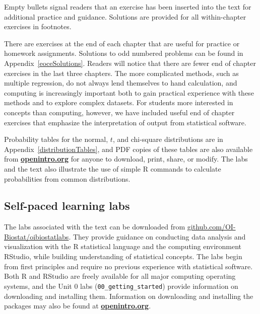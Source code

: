 \begin{exercisewrap}
\begin{nexercise}
Empty bullets signal readers that an exercise has been inserted into the text for additional practice and guidance. Solutions are provided for all within-chapter exercises in footnotes.\footnotemark
\end{nexercise}
\end{exercisewrap}

There are exercises at the end of each chapter that are useful for practice or homework assignments. Solutions to odd numbered problems can be found in Appendix~\ref{eoceSolutions}. Readers will notice that there are fewer end of chapter exercises in the last three chapters.  The more complicated methods, such as multiple regression, do not always lend themselves to hand calculation, and computing is increasingly important both to gain practical experience with these methods and to explore complex datasets. For students more interested in concepts than computing, however, we have included useful end of chapter exercises that emphasize the interpretation of output from statistical software.

Probability tables for the normal, $t$, and chi-square distributions are in Appendix~\ref{distributionTables}, and PDF copies of these tables are also available from \href{http://www.openintro.org}{\color{black}\textbf{openintro.org}} for anyone to download, print, share, or modify.  The labs and the text also illustrate the use of simple \textsf{R} commands to calculate probabilities from common distributions.

\subsection*{Self-paced learning labs}

The labs associated with the text can be downloaded from \href{https://github.com/OI-Biostat/oi_biostat_labs}{github.com/OI-Biostat/oi\us{}biostat\us{}labs}.  They provide guidance on conducting data analysis and visualization with the \textsf{R} statistical language and the computing environment RStudio, while building understanding of statistical concepts.  The labs begin from first principles and require no previous experience with statistical software. Both \textsf{R} and RStudio are freely available for all major computing operating systems, and the Unit 0 labs (\texttt{00\_getting\_started}) provide information on downloading and installing them. Information on downloading and installing the packages may also be found at \href{http://www.openintro.org}{\color{black}\textbf{openintro.org}}. 

